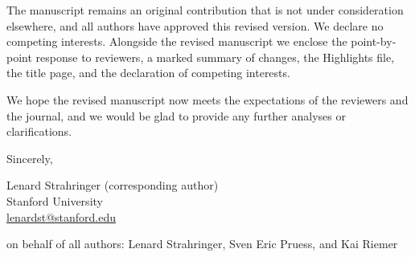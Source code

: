 \documentclass[12pt]{article}
\begin{document}
\vspace{0.5em}

\noindent The manuscript remains an original contribution that is not under consideration elsewhere, and all authors have approved this revised version. We declare no competing interests. Alongside the revised manuscript we enclose the point-by-point response to reviewers, a marked summary of changes, the Highlights file, the title page, and the declaration of competing interests.

\vspace{0.5em}

\noindent We hope the revised manuscript now meets the expectations of the reviewers and the journal, and we would be glad to provide any further analyses or clarifications.

\vspace{1em}

\noindent Sincerely,

\vspace{0.5em}

\noindent Lenard Strahringer (corresponding author)\\
Stanford University\\
\href{mailto:lenardst@stanford.edu}{lenardst@stanford.edu}

\vspace{0.5em}

\noindent on behalf of all authors: Lenard Strahringer, Sven Eric Pruess, and Kai Riemer
\end{document}
